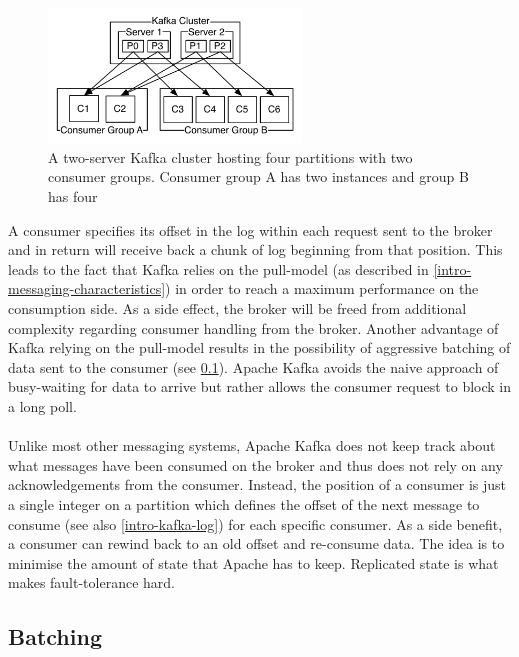 \begin{figure}[H]
    \centering
    \includegraphics[width=0.6\textwidth]{images/consumer-groups.png}
    \caption{A two-server Kafka cluster hosting four partitions with two consumer groups. Consumer group A has two instances and group B has four \cite{apachekafka}}
    \label{fig:the-log}
\end{figure}

A consumer specifies its offset in the log within each request sent to the
broker and in return will receive back a chunk of log beginning from that
position. This leads to the fact that Kafka relies on the pull-model (as
described in \ref{intro-messaging-characteristics}) in order to reach a maximum
performance on the consumption side. As a side effect, the broker will be freed
from additional complexity regarding consumer handling from the broker. Another
advantage of Kafka relying on the pull-model results in the possibility of
aggressive batching of data sent to the consumer (see
\ref{intro-kafka-components-batching}). Apache Kafka avoids the naive approach
of busy-waiting for data to arrive but rather allows the consumer request to
block in a \gls{long poll}. \cite{apachekafka}
\\ \\
Unlike most other messaging systems, Apache Kafka does not keep track about what
messages have been consumed on the broker and thus does not rely on any
acknowledgements from the consumer. Instead, the position of a consumer is just
a single integer on a partition which defines the offset of the next message to
consume (see also \ref{intro-kafka-log}) for each specific consumer. As a side
benefit, a consumer can rewind back to an old offset and re-consume data. The
idea is to minimise the amount of state that Apache has to keep. Replicated state
is what makes fault-tolerance hard. \cite{apachekafka}

\subsection{Batching}
\label{intro-kafka-components-batching}

